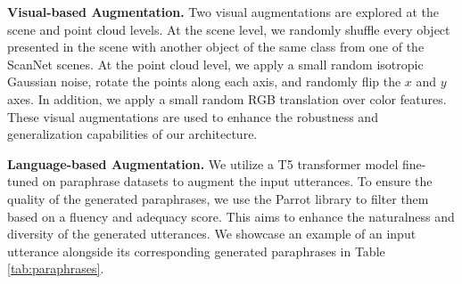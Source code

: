 \begin{table}
\centering
\caption{Ablation study for different components of our {\papernameAbbrev} framework, such as different augmentation techniques and distractor loss. All the experiments are conducted on 10\% of Nr3D dataset.} 
\label{appendix_table_data_aug_10}
\end{table}
\noindent \textbf{Visual-based Augmentation.}
Two visual augmentations are explored at the scene and point cloud levels. 
At the scene level, we randomly shuffle every object presented in the scene with another object of the same class from one of the ScanNet scenes. 
At the point cloud level, we apply a small random isotropic Gaussian noise, rotate the points along each axis, and randomly flip the $x$ and $y$ axes.
In addition, we apply a small random RGB translation over color features. 
These visual augmentations are used to enhance the robustness and generalization capabilities of our architecture.

\noindent \textbf{Language-based Augmentation.}
We utilize a T5 \citep{raffel2019t5} transformer model fine-tuned on paraphrase datasets to augment the input utterances. 
To ensure the quality of the generated paraphrases, we use the Parrot library \citep{prithivida2021parrot} to filter them based on a fluency and adequacy score. 
This aims to enhance the naturalness and diversity of the generated utterances.
We showcase an example of an input utterance alongside its corresponding generated paraphrases in Table \ref{tab:paraphrases}. 

